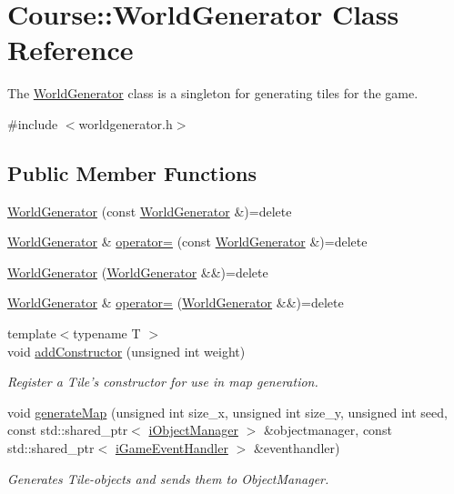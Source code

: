 \hypertarget{classCourse_1_1WorldGenerator}{\section{Course\-:\-:World\-Generator Class Reference}
\label{classCourse_1_1WorldGenerator}
}


The \hyperlink{classCourse_1_1WorldGenerator}{World\-Generator} class is a singleton for generating tiles for the game.  




{\ttfamily \#include $<$worldgenerator.\-h$>$}

\subsection*{Public Member Functions}
\begin{DoxyCompactItemize}
\item 
\hyperlink{classCourse_1_1WorldGenerator_a4946730e80bc6cdc42761dec637f29b0}{World\-Generator} (const \hyperlink{classCourse_1_1WorldGenerator}{World\-Generator} \&)=delete
\item 
\hyperlink{classCourse_1_1WorldGenerator}{World\-Generator} \& \hyperlink{classCourse_1_1WorldGenerator_a9b75e71fa1d3522c78407c61c85defc3}{operator=} (const \hyperlink{classCourse_1_1WorldGenerator}{World\-Generator} \&)=delete
\item 
\hyperlink{classCourse_1_1WorldGenerator_a5e023cb70d8c3a76ad32add672d9d211}{World\-Generator} (\hyperlink{classCourse_1_1WorldGenerator}{World\-Generator} \&\&)=delete
\item 
\hyperlink{classCourse_1_1WorldGenerator}{World\-Generator} \& \hyperlink{classCourse_1_1WorldGenerator_ae1ad94ce5da50aeaf3365c86804c10ca}{operator=} (\hyperlink{classCourse_1_1WorldGenerator}{World\-Generator} \&\&)=delete
\item 
{\footnotesize template$<$typename T $>$ }\\void \hyperlink{classCourse_1_1WorldGenerator_adc7ea4ba3cba155910cdb03130c84e75}{add\-Constructor} (unsigned int weight)
\begin{DoxyCompactList}\small\item\em Register a Tile's constructor for use in map generation. \end{DoxyCompactList}\item 
void \hyperlink{classCourse_1_1WorldGenerator_a7fe4468658c14aac5bc282fda98245e1}{generate\-Map} (unsigned int size\-\_\-x, unsigned int size\-\_\-y, unsigned int seed, const std\-::shared\-\_\-ptr$<$ \hyperlink{classCourse_1_1iObjectManager}{i\-Object\-Manager} $>$ \&objectmanager, const std\-::shared\-\_\-ptr$<$ \hyperlink{classCourse_1_1iGameEventHandler}{i\-Game\-Event\-Handler} $>$ \&eventhandler)
\begin{DoxyCompactList}\small\item\em Generates Tile-\/objects and sends them to Object\-Manager. \end{DoxyCompactList}\end{DoxyCompactItemize}
